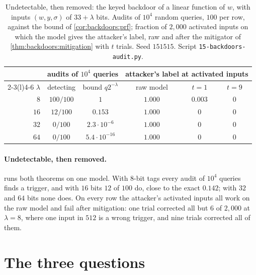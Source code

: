 \begin{refsection}
\begin{table}[t]
\centering\small
\begin{tabular}{@{}rccccc@{}}
\toprule
& \multicolumn{2}{c}{audits of $10^4$ queries} & \multicolumn{3}{c}{attacker's label at activated inputs}\\
\cmidrule(lr){2-3}\cmidrule(l){4-6}
$\lambda$ & detecting & bound $q2^{-\lambda}$ & raw model & $t=1$ & $t=9$\\
\midrule
$8$ & $100/100$ & $1$ & $1.000$ & $0.003$ & $0$\\
$16$ & $12/100$ & $0.153$ & $1.000$ & $0$ & $0$\\
$32$ & $0/100$ & $2.3\cdot10^{-6}$ & $1.000$ & $0$ & $0$\\
$64$ & $0/100$ & $5.4\cdot10^{-16}$ & $1.000$ & $0$ & $0$\\
\bottomrule
\end{tabular}
\caption{Undetectable, then removed: the keyed backdoor of a linear function of $w$, with inputs $(w,y,\sigma)$ of $33+\lambda$ bits. Audits of $10^4$ random queries, $100$ per row, against the bound of \cref{cor:backdoors:prf}; fraction of $2{,}000$ activated inputs on which the model gives the attacker's label, raw and after the mitigator of \cref{thm:backdoors:mitigation} with $t$ trials. Seed $151515$. Script \texttt{15-backdoors-audit.py}.}
\label{tab:backdoors:removal}
\end{table}

\paragraph{Undetectable, then removed.}  runs both theorems on one model. With $8$-bit tags every audit of $10^4$ queries finds a trigger, and with $16$ bits $12$ of $100$ do, close to the exact $0.142$; with $32$ and $64$ bits none does. On every row the attacker's activated inputs all work on the raw model and fail after mitigation: one trial corrected all but $6$ of $2{,}000$ at $\lambda=8$, where one input in $512$ is a wrong trigger, and nine trials corrected all of them.

\section{The three questions}\label{sec:backdoors:questions}


\end{refsection}
